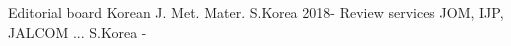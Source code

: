 

\begin{cvhonors}

  \cvhonor
    {Editorial board}
    {Korean J. Met. Mater.}
    {S.Korea} %
    {2018-} %
    \cvhonor
    {Review services}
    {JOM, IJP, JALCOM ...}
    {S.Korea} %
    {-} %
\end{cvhonors}
